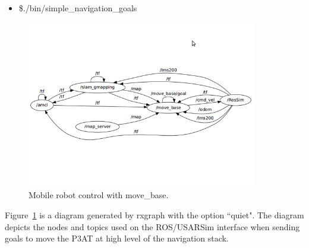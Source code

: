 \begin{itemize}
\item[]\$./bin/simple\_navigation\_goals
\end{itemize}

\begin{figure}[t!]
\centering
\includegraphics[width=10cm]{Figures/Misc/move_base.jpg}
\caption{Mobile robot control with move\_base.}\label{fig:movebase}
\end{figure}
Figure~\ref{fig:movebase} is a diagram generated by rxgraph with the option ``quiet". The diagram depicts the nodes and topics used on the ROS/USARSim interface when sending goals to move the P3AT at high level of the navigation stack. 
